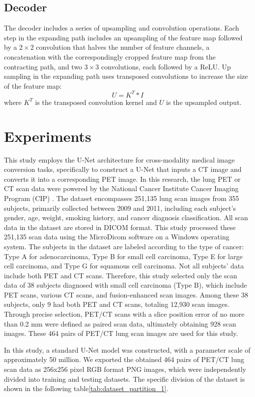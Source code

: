 \documentclass[twocolumn]{article}
\begin{document}
\subsection{Decoder}
The decoder includes a series of upsampling and convolution operations. Each step in the expanding path includes an upsampling of the feature map followed by a $2\times2$ convolution that halves the number of feature channels, a concatenation with the correspondingly cropped feature map from the contracting path, and two $3\times3$ convolutions, each followed by a ReLU. Up sampling in the expanding path uses transposed convolutions to increase the size of the feature map:
\[
	U = K^T * I
\]
where \(K^T\) is the transposed convolution kernel and \(U\) is the upsampled output.


\section{Experiments}
This study employs the U-Net architecture for cross-modality medical image conversion tasks, specifically to construct a U-Net that inputs a CT image and converts it into a corresponding PET image. In this research, the lung PET or CT scan data were powered by the National Cancer Institute Cancer Imaging Program (CIP) \cite{li_large-scale_2020}. The dataset encompasses 251,135 lung scan images from 355 subjects, primarily collected between 2009 and 2011, including each subject's gender, age, weight, smoking history, and cancer diagnosis classification. All scan data in the dataset are stored in DICOM format. This study processed these 251,135 scan data using the MicroDicom software on a Windows operating system. The subjects in the dataset are labeled according to the type of cancer: Type A for adenocarcinoma, Type B for small cell carcinoma, Type E for large cell carcinoma, and Type G for squamous cell carcinoma. Not all subjects' data include both PET and CT scans. Therefore, this study selected only the scan data of 38 subjects diagnosed with small cell carcinoma (Type B), which include PET scans, various CT scans, and fusion-enhanced scan images. Among these 38 subjects, only 9 had both PET and CT scans, totaling 12,930 scan images. Through precise selection, PET/CT scans with a slice position error of no more than 0.2 mm were defined as paired scan data, ultimately obtaining 928 scan images. These 464 pairs of PET/CT lung scan images are used for this study.

In this study, a standard U-Net model was constructed, with a parameter scale of approximately 50 million. We exported the obtained 464 pairs of PET/CT lung scan data as 256x256 pixel RGB format PNG images, which were independently divided into training and testing datasets. The specific division of the dataset is shown in the following table\ref{tab:dataset_partition_1}.
\end{document}
